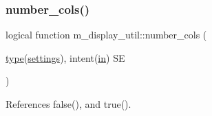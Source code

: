 \mbox{\label{namespacem__display__util_a837cfbf5c0d097da743220ac0acfaec8}} 
\subsubsection{\texorpdfstring{number\+\_\+cols()}{number\_cols()}}
{\footnotesize\ttfamily logical function m\+\_\+display\+\_\+util\+::number\+\_\+cols (\begin{DoxyParamCaption}\item[{\hyperlink{stop__watch_83_8txt_a70f0ead91c32e25323c03265aa302c1c}{type}(\hyperlink{structm__display__util_1_1settings}{settings}), intent(\hyperlink{M__journal_83_8txt_afce72651d1eed785a2132bee863b2f38}{in})}]{SE }\end{DoxyParamCaption})\hspace{0.3cm}{\ttfamily [private]}}



References false(), and true().

